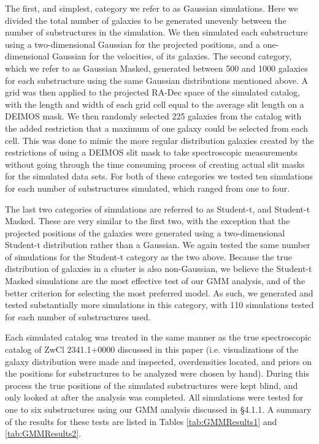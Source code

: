\documentclass[onecolumn]{aastex}
\begin{document}
The first, and simplest, category we refer to as Gaussian simulations.  Here we divided the total number of galaxies to be generated unevenly between the number of substructures in the simulation.  We then simulated each substructure using a two-dimensional Gaussian for the projected positions, and a one-dimensional Gaussian for the velocities, of its galaxies.  The second category, which we refer to as Gaussian Masked, generated between 500 and 1000 galaxies for each substructure using the same Gaussian distributions mentioned above.  A grid was then applied to the projected RA-Dec space of the simulated catalog, with the length and width of each grid cell equal to the average slit length on a DEIMOS mask.  We then randomly selected 225 galaxies from the catalog with the added restriction that a maximum of one galaxy could be selected from each cell.  This was done to mimic the more regular distribution galaxies created by the restrictions of using a DEIMOS slit mask to take spectroscopic measurements without going through the time consuming process of creating actual slit masks for the simulated data sets.  For both of these categories we tested ten simulations for each number of substructures simulated, which ranged from one to four.

The last two categories of simulations are referred to as Student-t, and Student-t Masked.  These are very similar to the first two, with the exception that the projected positions of the galaxies were generated using a two-dimensional Student-t distribution rather than a Gaussian.  We again tested the same number of simulations for the Student-t category as the two above.  Because the true distribution of galaxies in a cluster is also non-Gaussian, we believe the Student-t Masked simulations are the most effective test of our GMM analysis, and of the better criterion for selecting the most preferred model.  As such, we generated and tested substantially more simulations in this category, with 110 simulations tested for each number of substructures used.

Each simulated catalog was treated in the same manner as the true spectroscopic catalog of ZwCl 2341.1+0000 discussed in this paper (i.e. visualizations of the galaxy distribution were made and inspected, overdensities located, and priors on the positions for substructures to be analyzed were chosen by hand).  During this process the true positions of the simulated substructures were kept blind, and only looked at after the analysis was completed.  All simulations were tested for one to six substructures using our GMM analysis discussed in \S 4.1.1.  A summary of the results for these tests are listed in Tables \ref{tab:GMMResults1} and \ref{tab:GMMResults2}.
\end{document}
